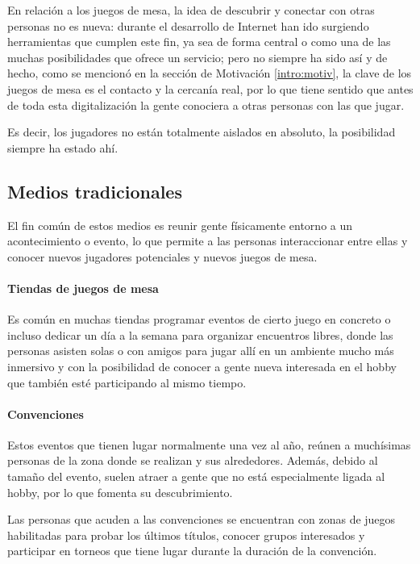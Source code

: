         En relación a los juegos de mesa, la idea de descubrir y conectar con otras personas no es nueva: durante el desarrollo de Internet han ido surgiendo herramientas que cumplen este fin, ya sea de forma central o como una de las muchas posibilidades que ofrece un servicio; pero no siempre ha sido así y de hecho, como se mencionó en la sección de Motivación \ref{intro:motiv}, la clave de los juegos de mesa es el contacto y la cercanía real, por lo que tiene sentido que antes de toda esta digitalización la gente conociera a otras personas con las que jugar.

        Es decir, los jugadores no están totalmente aislados en absoluto, la posibilidad siempre ha estado ahí.


        \subsection{Medios tradicionales}

            El fin común de estos medios es reunir gente físicamente entorno a un acontecimiento o evento, lo que permite a las personas interaccionar entre ellas y conocer nuevos jugadores potenciales y nuevos juegos de mesa.

            \paragraph{Tiendas de juegos de mesa}

                Es común en muchas tiendas programar eventos de cierto juego en concreto o incluso dedicar un día a la semana para organizar encuentros libres, donde las personas asisten solas o con amigos para jugar allí en un ambiente mucho más inmersivo y con la posibilidad de conocer a gente nueva interesada en el hobby que también esté participando al mismo tiempo.

            \paragraph{Convenciones}


                Estos eventos que tienen lugar normalmente una vez al año, reúnen a muchísimas personas de la zona donde se realizan y sus alrededores. Además, debido al tamaño del evento, suelen atraer a gente que no está especialmente ligada al hobby, por lo que fomenta su descubrimiento.

                Las personas que acuden a las convenciones se encuentran con zonas de juegos habilitadas para probar los últimos títulos, conocer grupos interesados y participar en torneos que tiene lugar durante la duración de la convención.


